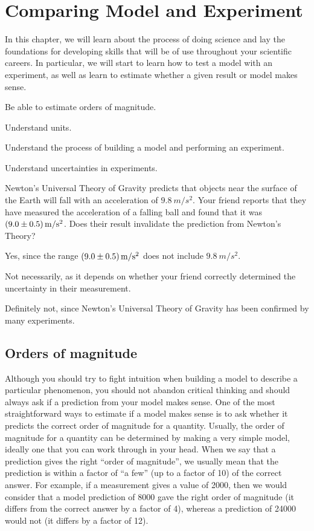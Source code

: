 
\chapter{Comparing Model and Experiment}
\label{chap:modelandexperiment}
In this chapter, we will learn about the process of doing science and lay the foundations for developing skills that will be of use throughout your scientific careers. In particular, we will start to learn how to test a model with an experiment, as well as learn to estimate whether a given result or model makes sense.
\begin{learningObjectives}{
\item Be able to estimate orders of magnitude.
\item Understand units.
\item Understand the process of building a model and performing an experiment.
\item Understand uncertainties in experiments.}
\end{learningObjectives}
\begin{opening}
\begin{MCquestion}{Newton's Universal Theory of Gravity predicts that objects near the surface of the Earth will fall with an acceleration of $\SI{9.8}{m/s^2}$. Your friend reports that they have measured the acceleration of a falling ball and found that it was $\SI{9.0\pm 0.5}{m/s^2}$. Does their result invalidate the prediction from Newton's Theory?}
\item Yes, since the range $\SI{9.0\pm 0.5}{m/s^2}$ does not include $\SI{9.8}{m/s^2}$.
\item Not necessarily, as it depends on whether your friend correctly determined the uncertainty in their measurement.\correct
\item Definitely not, since Newton's Universal Theory of Gravity has been confirmed by many experiments.
\end{MCquestion}
\end{opening}

\section{Orders of magnitude}
Although you should try to fight intuition when building a model to describe a particular phenomenon, you should not abandon critical thinking and should always ask if a prediction from your model makes sense. One of the most straightforward ways to estimate if a model makes sense is to ask whether it predicts the correct order of magnitude for a quantity. Usually, the order of magnitude for a quantity can be determined by making a very simple model, ideally one that you can work through in your head. When we say that a prediction gives the right ``order of magnitude'', we usually mean that the prediction is within a factor of ``a few'' (up to a factor of 10) of the correct answer. For example, if a measurement gives a value of 2000, then we would consider that a model prediction of 8000 gave the right order of magnitude (it differs from the correct answer by a factor of 4), whereas a prediction of 24000 would not (it differs by a factor of 12). 

